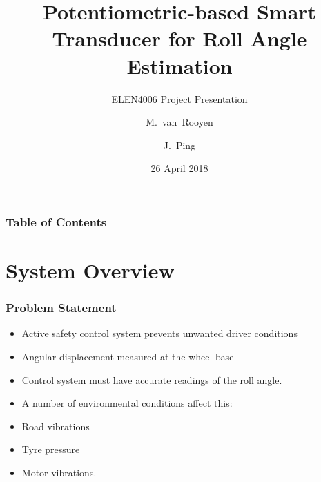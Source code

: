 \documentclass{beamer}
\title[Potentiometric Roll Angle Displacement Measurement] 
{Potentiometric-based Smart Transducer for Roll Angle Estimation}
\subtitle{ELEN4006 Project Presentation}
\author %
{M.~van~Rooyen \and J.~Ping}
\institute[Wits] %
{
  School of Electrical and Information Engineering, \\
  University of the Witwatersrand
}
\date{26 April 2018}
\begin{document}
	
\frame{\titlepage}

\begin{frame}
	\frametitle{Table of Contents}
	\tableofcontents[ 
	currentsection, 
	currentsubsection, 
	sectionstyle=show, 
	subsectionstyle=show, 
	] 
\end{frame}

\section{System Overview}
\begin{frame}
\frametitle{Problem Statement}

\begin{itemize}
	\item Active safety control system prevents unwanted driver conditions
	\item Angular displacement measured at the wheel base
	\item Control system must have accurate readings of the roll angle.
	\item A number of environmental conditions affect this:
	\setlength{\itemindent}{.3in}
	\item Road vibrations 
	\item Tyre pressure 
	\item Motor vibrations.
\end{itemize}
\end{frame}
\end{document}
